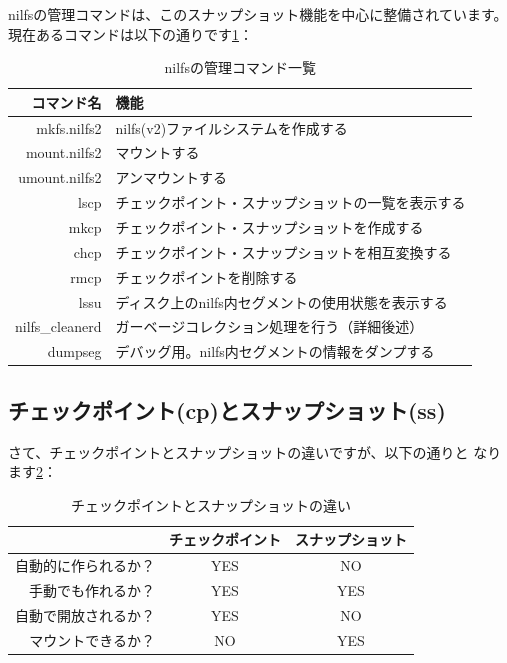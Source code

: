 \documentclass[mingoth,a4paper]{jsarticle}
\begin{document}
nilfsの管理コマンドは、このスナップショット機能を中心に整備されています。
現在あるコマンドは以下の通りです\ref{nilcmd}：
\begin{table}[h]
\begin{center}
\begin{tabular}{|r|l|}
\hline
コマンド名 & 機能 \\ \hline
mkfs.nilfs2   & nilfs(v2)ファイルシステムを作成する \\ \hline
mount.nilfs2  & マウントする \\ \hline
umount.nilfs2 & アンマウントする \\ \hline
lscp & チェックポイント・スナップショットの一覧を表示する \\ \hline
mkcp & チェックポイント・スナップショットを作成する \\ \hline
chcp & チェックポイント・スナップショットを相互変換する \\ \hline
rmcp & チェックポイントを削除する \\ \hline
lssu & ディスク上のnilfs内セグメントの使用状態を表示する \\ \hline
nilfs\_cleanerd & ガーベージコレクション処理を行う（詳細後述） \\ \hline
dumpseg & デバッグ用。nilfs内セグメントの情報をダンプする \\ \hline
\end{tabular}
\caption{nilfsの管理コマンド一覧}
\label{nilcmd}
\end{center}
\end{table}

\subsection{チェックポイント(cp)とスナップショット(ss)}
さて、チェックポイントとスナップショットの違いですが、以下の通りと
なります\ref{nilcpvsss}：
\begin{table}[h]
\begin{center}
\begin{tabular}{|r|c|c|}
\hline
 & チェックポイント  & スナップショット \\ \hline
自動的に作られるか？ & YES &  NO \\ \hline
手動でも作れるか？   & YES & YES \\ \hline
自動で開放されるか？ & YES &  NO \\ \hline
マウントできるか？   &  NO & YES \\ \hline
\end{tabular}
\caption{チェックポイントとスナップショットの違い}
\label{nilcpvsss}
\end{center}
\end{table}
\end{document}
